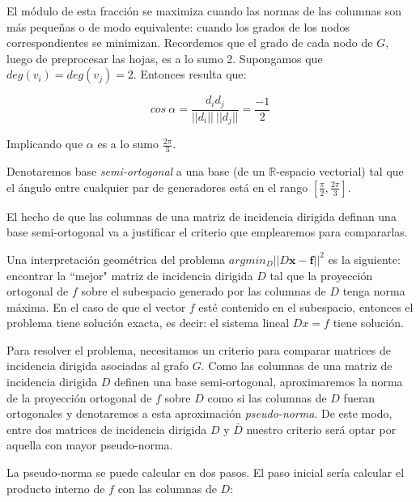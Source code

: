 \documentclass[10pt, a4paper, twocolumn]{article} %
\begin{document}
El módulo de esta fracción se maximiza cuando las normas de las columnas
 son más pequeñas o de modo equivalente: cuando los grados de los nodos 
 correspondientes se minimizan. Recordemos que el grado de cada nodo de 
 $G$, luego de preprocesar las hojas, es a lo sumo 2. Supongamos que  
 $deg(v_i) = deg(v_j) = 2$. Entonces resulta que:

$$cos \ \alpha = \frac{d_i d_j}{||d_i|| \ ||d_j||} = \frac{-1}{2}$$

\smallskip

Implicando que $\alpha$ es a lo sumo $\frac{2\pi}{3}$.

\smallskip

Denotaremos base \textit{semi-ortogonal} a una base (de un 
$\mathbb{R}$-espacio vectorial) tal que el ángulo entre cualquier par de 
generadores está en el rango $[\frac{\pi}{2},\frac{2\pi}{3}]$.

\smallskip

El hecho de que las columnas de una matriz de incidencia dirigida 
definan una base semi-ortogonal va a justificar el criterio que 
emplearemos para compararlas.

\bigskip


Una interpretación geométrica del problema $argmin_D||D \bm x- \bm f
||^2$ es la siguiente: encontrar la ``mejor" matriz de incidencia 
dirigida $D$ tal que la proyección ortogonal de $f$ sobre el subespacio 
generado por las columnas de $D$ tenga norma máxima. En el caso de que 
el vector $f$ esté contenido en el subespacio, entonces el problema 
tiene solución exacta, es decir: el sistema lineal $Dx = f$ tiene 
solución.

\smallskip

Para resolver el problema, necesitamos un criterio para comparar  
matrices de incidencia dirigida asociadas al grafo $G$. Como las 
columnas de una matriz de incidencia dirigida $D$ definen una base 
semi-ortogonal, aproximaremos la norma de la proyección 
ortogonal de $f$ sobre $D$ como si las columnas de $D$ fueran 
ortogonales y denotaremos a esta aproximación \textit{pseudo-norma}.
 De este modo, entre dos matrices de incidencia dirigida $D$ y 
 $\bar{D}$ nuestro criterio será optar por aquella con mayor 
 pseudo-norma. 

\smallskip

La pseudo-norma se puede calcular en dos pasos. El paso inicial sería 
calcular el producto interno de $f$ con las columnas de $D$:
\end{document}
